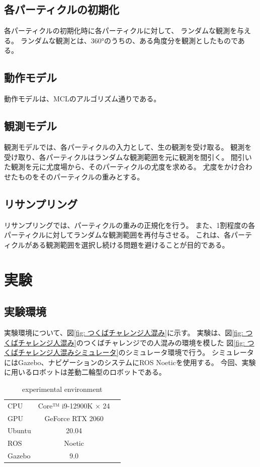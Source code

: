 \documentclass{jarticle}
\begin{document}
\subsection{各パーティクルの初期化}

各パーティクルの初期化時に各パーティクルに対して、
ランダムな観測を与える。
ランダムな観測とは、360°のうちの、ある角度分を観測としたものである。

\subsection{動作モデル}

動作モデルは、MCLのアルゴリズム通りである。

\subsection{観測モデル}

観測モデルでは、各パーティクルの入力として、生の観測を受け取る。
観測を受け取り、各パーティクルはランダムな観測範囲を元に観測を間引く。
間引いた観測を元に尤度場から、そのパーティクルの尤度を求める。
尤度をかけ合わせたものをそのパーティクルの重みとする。

\subsection{リサンプリング}

リサンプリングでは、パーティクルの重みの正規化を行う。
また、1割程度の各パーティクルに対してランダムな観測範囲を再付与させる。
これは、各パーティクルがある観測範囲を選択し続ける問題を避けることが目的である。

\section{実験}%

\subsection{実験環境}

実験環境について、図\ref{fig: つくばチャレンジ人混み}に示す。
実験は、図\ref{fig: つくばチャレンジ人混み}のつくばチャレンジでの人混みの環境を模した
図\ref{fig: つくばチャレンジ人混みシミュレータ}のシミュレータ環境で行う。
シミュレータにはGazebo、ナビゲーションのシステムにROS Noeticを使用する。
今回、実験に用いるロボットは差動二輪型のロボットである。

\begin{table}[hbtp]
  \caption{experimental environment}
  \label{table:data_type}
  \centering
  \begin{tabular}{lcr}
    \hline
    CPU & Core™ i9-12900K × 24 \\
    GPU & GeForce RTX 2060 \\
    Ubuntu & 20.04 \\
    ROS  & Noetic \\
    Gazebo  &  9.0 \\
    \hline
  \end{tabular}
\end{table}
\end{document}
